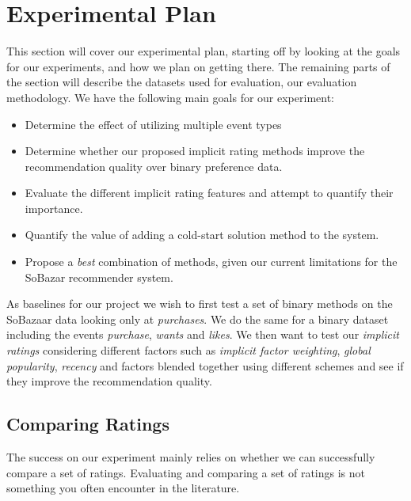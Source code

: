 \clearpage
\section{Experimental Plan}
\label{sec:experimental-plan}


This section will cover our experimental plan, starting off by looking at the
goals for our experiments, and how we plan on getting there. The remaining parts of
the section will describe the datasets used for evaluation, our evaluation methodology.
We have the following main goals for our experiment:

\begin{itemize}
	\item Determine the effect of utilizing multiple event types
	\item Determine whether our proposed implicit rating methods improve the recommendation quality over
	binary preference data.
	\item Evaluate the different implicit rating features and attempt to quantify their importance.
	\item Quantify the value of adding a cold-start solution method to the system.
	\item Propose a \emph{best} combination of methods, given our current limitations for the SoBazar recommender system.
\end{itemize}

As baselines for our project we wish to first test a set of binary methods on the SoBazaar data
looking only at \emph{purchases}. We do the same for a binary dataset including the events
\emph{purchase}, \emph{wants} and \emph{likes}. We then want to test our \emph{implicit ratings}
considering different factors such as \emph{implicit factor weighting}, \emph{global popularity},
\emph{recency} and factors blended together using different schemes and see if they improve the
recommendation quality.

\subsection{Comparing Ratings}

The success on our experiment mainly relies on whether we can successfully compare a set of ratings.
Evaluating and comparing a set of ratings is not something you often encounter in the literature.

